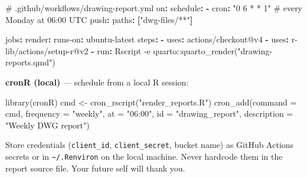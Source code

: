 \documentclass[
  11pt,
  letterpaper,
  DIV=11,
  numbers=noendperiod]{scrreprt}
\newenvironment{Shaded}{\begin{snugshade}}{\end{snugshade}}
\newcommand{\AttributeTok}[1]{\textcolor[rgb]{0.40,0.45,0.13}{#1}}
\newcommand{\CommentTok}[1]{\textcolor[rgb]{0.37,0.37,0.37}{#1}}
\newcommand{\FunctionTok}[1]{\textcolor[rgb]{0.28,0.35,0.67}{#1}}
\newcommand{\KeywordTok}[1]{\textcolor[rgb]{0.00,0.23,0.31}{\textbf{#1}}}
\newcommand{\NormalTok}[1]{\textcolor[rgb]{0.00,0.23,0.31}{#1}}
\newcommand{\OtherTok}[1]{\textcolor[rgb]{0.00,0.23,0.31}{#1}}
\newcommand{\StringTok}[1]{\textcolor[rgb]{0.13,0.47,0.30}{#1}}
\begin{document}
\begin{Shaded}
\begin{Highlighting}[]
\CommentTok{\# .github/workflows/drawing{-}report.yml}
\FunctionTok{on}\KeywordTok{:}
\AttributeTok{  }\FunctionTok{schedule}\KeywordTok{:}
\AttributeTok{    }\KeywordTok{{-}}\AttributeTok{ }\FunctionTok{cron}\KeywordTok{:}\AttributeTok{ }\StringTok{"0 6 * * 1"}\CommentTok{   \# every Monday at 06:00 UTC}
\AttributeTok{  }\FunctionTok{push}\KeywordTok{:}
\AttributeTok{    }\FunctionTok{paths}\KeywordTok{:}\AttributeTok{ }\KeywordTok{[}\StringTok{"dwg{-}files/**"}\KeywordTok{]}

\FunctionTok{jobs}\KeywordTok{:}
\AttributeTok{  }\FunctionTok{render}\KeywordTok{:}
\AttributeTok{    }\FunctionTok{runs{-}on}\KeywordTok{:}\AttributeTok{ ubuntu{-}latest}
\AttributeTok{    }\FunctionTok{steps}\KeywordTok{:}
\AttributeTok{      }\KeywordTok{{-}}\AttributeTok{ }\FunctionTok{uses}\KeywordTok{:}\AttributeTok{ actions/checkout@v4}
\AttributeTok{      }\KeywordTok{{-}}\AttributeTok{ }\FunctionTok{uses}\KeywordTok{:}\AttributeTok{ r{-}lib/actions/setup{-}r@v2}
\AttributeTok{      }\KeywordTok{{-}}\AttributeTok{ }\FunctionTok{run}\KeywordTok{:}\AttributeTok{ Rscript {-}e \textquotesingle{}quarto::quarto\_render("drawing{-}reports.qmd")\textquotesingle{}}
\end{Highlighting}
\end{Shaded}

\textbf{cronR (local)} --- schedule from a local R session:

\begin{Shaded}
\begin{Highlighting}[]
\FunctionTok{library}\NormalTok{(cronR)}
\NormalTok{cmd }\OtherTok{\textless{}{-}} \FunctionTok{cron\_rscript}\NormalTok{(}\StringTok{"render\_reports.R"}\NormalTok{)}
\FunctionTok{cron\_add}\NormalTok{(}\AttributeTok{command     =}\NormalTok{ cmd,}
         \AttributeTok{frequency   =} \StringTok{"weekly"}\NormalTok{,}
         \AttributeTok{at          =} \StringTok{"06:00"}\NormalTok{,}
         \AttributeTok{id          =} \StringTok{"drawing\_report"}\NormalTok{,}
         \AttributeTok{description =} \StringTok{"Weekly DWG report"}\NormalTok{)}
\end{Highlighting}
\end{Shaded}

\begin{tcolorbox}[enhanced jigsaw, titlerule=0mm, colback=white, colframe=quarto-callout-tip-color-frame, bottomtitle=1mm, bottomrule=.15mm, coltitle=black, arc=.35mm, left=2mm, title=\textcolor{quarto-callout-tip-color}{\faLightbulb}\hspace{0.5em}{Tip}, colbacktitle=quarto-callout-tip-color!10!white, toptitle=1mm, breakable, toprule=.15mm, rightrule=.15mm, leftrule=.75mm, opacitybacktitle=0.6, opacityback=0]

Store credentials (\texttt{client\_id}, \texttt{client\_secret}, bucket
name) as GitHub Actions secrets or in
\texttt{\textasciitilde{}/.Renviron} on the local machine. Never
hardcode them in the report source file. Your future self will thank
you.

\end{tcolorbox}
\end{document}
